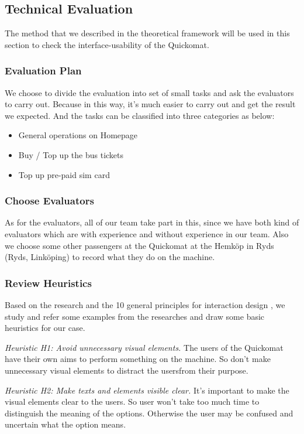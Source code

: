 \documentclass[twocolumn]{article}
\begin{document}
\subsection{Technical Evaluation}
\label{sec:case-study-technical-evaluation}
The method that we described in the theoretical framework will be used in this section to check the interface-usability of the Quickomat.

\subsubsection{Evaluation Plan}
We choose to divide the evaluation into set of small tasks and ask the evaluators to carry out. Because in this way, it’s much easier to carry out and get the result we expected. And the tasks can be classified into three categories as below:
\begin{itemize}
  \item General operations on Homepage
  \item Buy / Top up the bus tickets
  \item Top up pre-paid sim card
\end{itemize}

\subsubsection{Choose Evaluators}
As for the evaluators, all of our team take part in this, since we have both kind of evaluators which are with experience and without experience in our team. Also we choose some other passengers at the Quickomat at the Hemköp in Ryds (Ryds, Linköping) to record what they do on the machine.

\subsubsection{Review Heuristics}
Based on the research and the 10 general principles for interaction design \citep{Nielsen1994}, we study and refer some examples from the researches and draw some basic heuristics for our case.

\emph{Heuristic H1: Avoid unnecessary visual elements.} The users of the Quickomat have their own aims to perform something on the machine. So don’t make unnecessary visual elements to distract the usersfrom their purpose.

\emph{Heuristic H2: Make texts and elements visible clear.} It’s important to make the visual elements clear to the users. So user won’t take too much time to distinguish the meaning of the options. Otherwise the user may be confused and uncertain what the option means.
\end{document}
